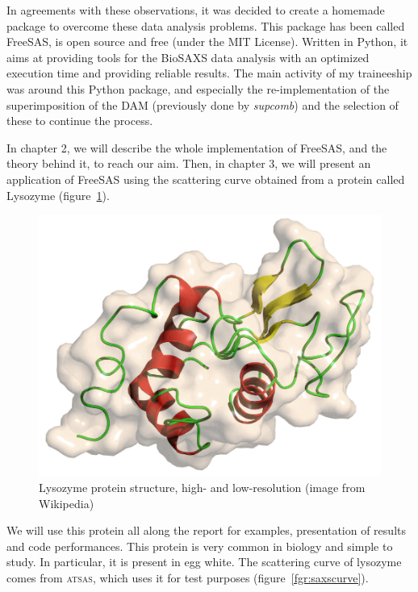 \documentclass[a4paper, 11pt]{report}
\begin{document}
In agreements with these observations, it was decided to create a 
homemade package to overcome these data analysis problems. 
This package has been called FreeSAS, is open source and free (under 
the MIT License). 
Written in Python, it aims at providing tools for the BioSAXS data 
analysis with an optimized execution time and providing reliable 
results. 
The main activity of my traineeship was around this Python package, 
and especially the re-implementation of the superimposition of the DAM 
(previously done by \textit{supcomb}) and the selection of these to 
continue the process.

In chapter 2, we will describe the whole implementation of FreeSAS, 
and the theory behind it, to reach our aim. 
Then, in chapter 3, we will present an application of FreeSAS using the 
scattering curve obtained from a protein called Lysozyme 
(figure~\ref{fgr:lysozyme}). 
\begin{figure}
\centering
\includegraphics[scale=0.2]{lysozyme_wiki.png}
\caption{Lysozyme protein structure, high- and low-resolution (image 
  from Wikipedia)}
\label{fgr:lysozyme}
\end{figure}

We will use this protein all along the report for examples, 
presentation of results and code performances. 
This protein is very common in biology and simple to study. 
In particular, it is present in egg white. 
The scattering curve of lysozyme comes from \textsc{atsas}, which uses 
it for test purposes (figure~\ref{fgr:saxscurve}).
\end{document}
